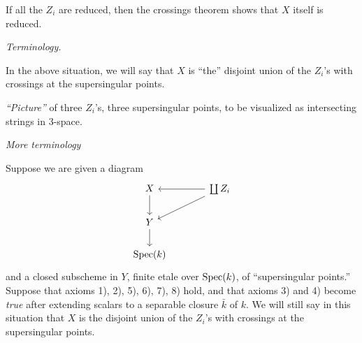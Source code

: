\begin{krem}\label{rem:13.1.4}
If all the $Z_i$ are reduced, then the crossings theorem shows that $X$ itself is reduced.
\end{krem}

\kmitem\label{item:13.1.5}\emph{Terminology.}\par
In the above situation, we will say that $X$ is ``the'' disjoint union of the $Z_i$'s with crossings at the supersingular points.

\kmitem\label{item:13.1.6}\emph{``Picture''} of three $Z_i$'s, three supersingular points, to be visualized as intersecting strings in 3-space.
\begin{center}
\end{center}

\kmitem\label{item:13.1.7}\emph{More terminology}\par
Suppose we are given a diagram
\[
\begin{tikzcd}[row sep=1.8em, column sep=large]
X \arrow[d] & \coprod Z_i \arrow[l] \arrow[ld] \\
Y \arrow[d] & \\
\Spec(k) &
\end{tikzcd}
\]
and a closed subscheme in $Y$, finite etale over $\operatorname{Spec}(k)$, of ``supersingular points.'' Suppose that axioms 1), 2), 5), 6), 7), 8) hold, and that axioms 3) and 4) become \emph{true} after extending scalars to a separable closure $\bar{k}$ of $k$. We will still say in this situation that $X$ is the disjoint union of the $Z_i$'s with crossings at the supersingular points.

